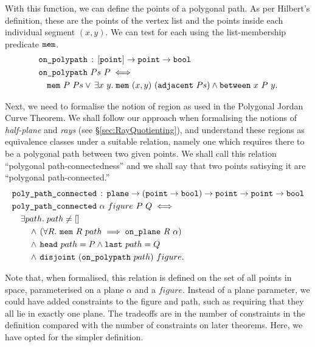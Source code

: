 With this function, we can define the points of a polygonal path. As per Hilbert's definition, these are the points of the vertex list and the points inside each individual segment $(x,y)$. We can test for each using the list-membership predicate $\texttt{mem}$.
\begin{equation}\label{eq:OnPolyPath}
  \begin{split}
    &\code{on\_polypath}\,:\,[\code{point}] \rightarrow \code{point} \rightarrow \code{bool}\\
    &\code{on\_polypath}\ Ps\ P \iff \\
    &\quad\code{mem}\ P\ Ps\vee\,\exists x\ y.\; \code{mem}\ (x,y)\ (\code{adjacent}\ Ps) \wedge \between{x}{P}{y}.
  \end{split}
\end{equation}

Next, we need to formalise the notion of region as used in the Polygonal Jordan Curve Theorem. We shall follow our approach when formalising the notions of \emph{half-plane} and \emph{rays} (see \S\ref{sec:RayQuotienting}), and understand these regions as equivalence classes under a suitable relation, namely one which requires there to be a polygonal path between two given points. We shall call this relation ``polygonal path-connectedness'' and we shall say that two points satisying it are ``polygonal path-connected.''
\begin{align*}
  &\code{poly\_path\_connected}\,:\,\code{plane}\rightarrow(\code{point} \rightarrow \code{bool}) \rightarrow \code{point} \rightarrow \code{point} \rightarrow \code{bool}\\
  &\code{poly\_path\_connected}\ \alpha\ figure\ P\ Q \iff\\
  &\quad\exists path.\; path \neq []\\
  &\qquad\wedge\,(\forall R.\ \code{mem}\ R\ path \implies \onplane{R}{\alpha})\\
  &\qquad\wedge\,\code{head}\ path = P \wedge \code{last}\ path = Q\\
  &\qquad\wedge\,\code{disjoint}\ (\code{on\_polypath}\ path)\ figure.
\end{align*}

Note that, when formalised, this relation is defined on the set of all points in space, parameterised on a plane $\alpha$ and a $figure$. Instead of a plane parameter, we could have added constraints to the figure and path, such as requiring that they all lie in exactly one plane. The tradeoffs are in the number of constraints in the definition compared with the number of constraints on later theorems. Here, we have opted for the simpler definition.

